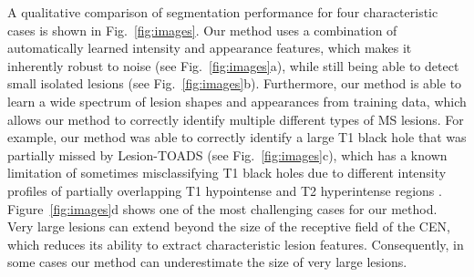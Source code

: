

A qualitative comparison of segmentation performance for four characteristic
cases is shown in Fig.~\ref{fig:images}. Our method uses a combination of
automatically learned intensity and appearance features, which makes it
inherently robust to noise (see Fig.~\ref{fig:images}a), while still being able
to detect small isolated lesions (see Fig.~\ref{fig:images}b). Furthermore, our
method is able to learn a wide spectrum of lesion shapes and appearances from
training data, which allows our method to correctly identify multiple different
types of MS lesions. For example, our method was able to correctly identify a
large T1 black hole that was partially missed by Lesion-TOADS (see
Fig.~\ref{fig:images}c), which has a known limitation of sometimes
misclassifying T1 black holes due to different intensity profiles of partially
overlapping T1 hypointense and T2 hyperintense regions \cite{shiee2010topology}.
Figure~\ref{fig:images}d shows one of the most challenging cases for our method.
Very large lesions can extend beyond the size of the receptive field of the CEN,
which reduces its ability to extract characteristic lesion features.
Consequently, in some cases our method can underestimate the size of very large
lesions.

